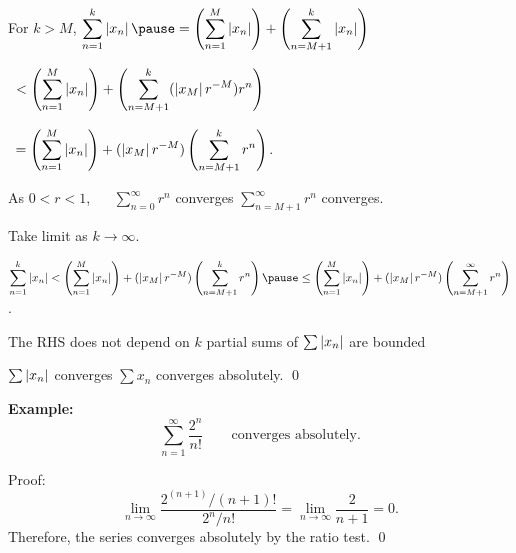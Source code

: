\documentclass[10pt,aspectratio=149]{beamer}
\begin{document}
\begin{frame}
For $k > M$,
\quad
$\displaystyle
\sum_{n=1}^k \abs{x_n}
\pause
=
\left(\sum_{n=1}^{M} \abs{x_n} \right)
+
\left(\sum_{n=M+1}^{k} \abs{x_n} \right)
$

\pause
\medskip

\qquad\qquad\qquad\qquad\quad\,\!
$\displaystyle
<
\left(\sum_{n=1}^{M} \left\lvert {x_n} \right\rvert \right)
+
\left(\sum_{n=M+1}^{k} 
(\left\lvert {x_M} \right\rvert r^{-M}) r^n
\right)
$

\pause
\medskip

\qquad\qquad\qquad\qquad\quad\,\!
$\displaystyle
=
\left(\sum_{n=1}^{M} \left\lvert {x_n} \right\rvert \right)
+
(\left\lvert {x_M} \right\rvert r^{-M})
\left( \sum_{n=M+1}^{k} r^n \right)$.

\pause
\medskip

As $0 < r < 1$, ~~
$\sum_{n=0}^{\infty} r^n$ converges
\pause
\wthus
$\sum_{n=M+1}^{\infty} r^n$ converges.

\pause
\medskip

Take limit as $k \to \infty$.

\pause
\medskip

$\displaystyle
\sum_{n=1}^k \abs{x_n}
<
\left(\sum_{n=1}^{M} \abs{x_n} \right)
+
(\abs{x_M} r^{-M})
\left( \sum_{n=M+1}^{k} r^n \right) 
\pause
\leq
\left(\sum_{n=1}^{M} \abs{x_n} \right)
+
(\abs{x_M} r^{-M})
\left( \sum_{n=M+1}^{\infty} r^n \right)$.


\pause
\medskip

The RHS does not depend on $k$
\pause
\wthus
partial sums of $\sum \left\lvert {x_n} \right\rvert$ are bounded

\pause
\thus \quad $\sum \left\lvert {x_n} \right\rvert$ converges
\pause
\wthus
$\sum x_n$ converges absolutely.
\qed

\end{frame}

\begin{frame}

\textbf{Example:}
\begin{equation*}
\sum_{n=1}^\infty \frac{2^n}{n!}
\qquad
\text{converges absolutely.}
\end{equation*}

\pause
\medskip

Proof:
\begin{equation*}
\lim_{n\to\infty} \frac{2^{(n+1)}/(n+1)!}{2^n / n!} =
\lim_{n\to\infty} \frac{2}{n+1} = 0 .
\end{equation*}
\pause
Therefore, the series converges absolutely by the ratio test.
\qed

\end{frame}
\end{document}
